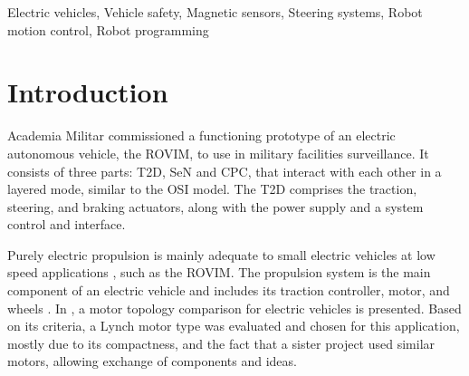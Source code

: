 \documentclass[journal]{IEEEtran}
\begin{document}
\begin{IEEEkeywords}
Electric vehicles, Vehicle safety, Magnetic sensors, Steering systems, Robot motion control, Robot programming
\end{IEEEkeywords}






%
\IEEEpeerreviewmaketitle



\section{Introduction}
% 
% 
% 
% 
 Academia Militar commissioned a functioning prototype of an electric autonomous vehicle, the \ac{ROVIM}, to use in military facilities surveillance. It consists of three parts: \ac{T2D}, \ac{SeN} and \ac{CPC}, that interact with each other in a layered mode, similar to the \ac{OSI} model.
The \ac{T2D} comprises the traction, steering, and braking actuators, along with the power supply and a system control and interface.

Purely electric propulsion is mainly adequate to small electric vehicles at low speed applications \cite{Chan_overview}, such as the \ac{ROVIM}. The propulsion system is the main component of an electric vehicle and includes its traction controller, motor, and wheels \cite{Chan_overview}. In \cite{Hashemnia_motores}, a motor topology comparison for electric vehicles is presented.
Based on its criteria, a Lynch motor type was evaluated and chosen for this application, mostly due to its compactness, and the fact that a sister project used similar motors, allowing exchange of components and ideas.
\end{document}
